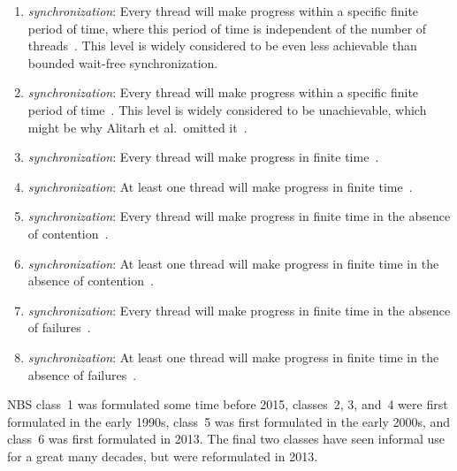 \begin{enumerate}
\item	\emph{ synchronization}:
	Every thread will make progress within a specific finite period
	of time, where this period of time is independent of the number
	of threads~\cite{HerlihyShavit2008Textbook}.
	This level is widely considered to be even less achievable than
	bounded wait-free synchronization.
\item	\emph{ synchronization}:
	Every thread will make progress within
	a specific finite period of time~\cite{Herlihy91}.
	This level is widely considered to be unachievable, which might be why
	Alitarh et al.\ omitted it~\cite{DanAlitarh2013PracticalProgress}.
\item	\emph{ synchronization}:
	Every thread will make progress
	in finite time~\cite{Herlihy93}.
\item	\emph{ synchronization}:
	At least one thread will
	make progress in finite time~\cite{Herlihy93}.
\item	\emph{ synchronization}:
	Every thread will make progress in finite time in the absence of
	contention~\cite{HerlihyLM03}.
\item	\emph{ synchronization}:
	At least one thread will make progress in finite time in the absence of
	contention~\cite{DanAlitarh2013PracticalProgress}.
\item	\emph{ synchronization}:
	Every thread will make progress in finite time in the absence of
	failures~\cite{DanAlitarh2013PracticalProgress}.
\item	\emph{ synchronization}:
	At least one thread will make progress in finite time in the absence of
	failures~\cite{DanAlitarh2013PracticalProgress}.
\end{enumerate}

NBS class~1 was formulated some time before 2015,
classes~2, 3, and~4 were first formulated in the early 1990s,
class~5 was first formulated in the early 2000s,
and class~6 was first formulated in 2013.
The final two classes have seen informal use for a great many decades,
but were reformulated in 2013.

\QuickQuizEnd

